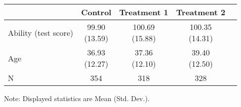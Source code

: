 \renewcommand\cellalign{t}
\begin{threeparttable}
\begin{tabular}{lcccc}
\toprule
 & Control & Treatment 1 & Treatment 2 \\
\midrule
\addlinespace
Ability (test score) & \makecell{99.90\\(13.59)} & \makecell{100.69\\(15.88)} & \makecell{100.35\\(14.31)} \\
Age & \makecell{36.93\\(12.27)} & \makecell{37.36\\(12.10)} & \makecell{39.40\\(12.50)} \\
\midrule
\addlinespace
N & 354 & 318 & 328 \\
\bottomrule
\end{tabular}
\footnotesize Note: Displayed statistics are Mean (Std. Dev.).
\end{threeparttable}